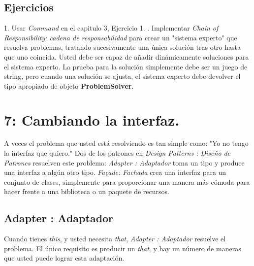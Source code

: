 \documentclass{article}
\begin{document}
\subsection{Ejercicios}
1. Usar \textit{Command} en el capitulo 3, Ejercicio 1.     . Implementar \textit{Chain of Responsibility: cadena de responsabilidad} para crear un "sistema experto" que resuelva problemas, tratando sucesivamente una única solución tras otro hasta que uno coincida. Usted debe ser capaz de añadir dinámicamente soluciones para el sistema experto. La prueba para la solución simplemente debe ser un juego de string, pero cuando una solución se ajusta, el sistema experto debe devolver el tipo apropiado de objeto \textbf{ProblemSolver}.     \newline

\section{7: Cambiando la interfaz.}

A veces el problema que usted está resolviendo es tan simple como: "Yo no tengo la interfaz que quiero." Dos de los patrones en \textit{Design Patterns : Diseño de Patrones} resuelven este problema: \textit{Adapter : Adaptador} toma un tipo y produce una interfaz a algún otro tipo.  \textit{Façade: Fachada} crea una interfaz para un conjunto de clases, simplemente para proporcionar una manera más cómoda para hacer frente a una biblioteca o un paquete de recursos.

\subsection{Adapter : Adaptador}

Cuando tienes \textit{this}, y usted necesita \textit{that}, \textit{Adapter : Adaptador} resuelve el problema. El único requisito es producir un \textit{that},  y hay un número de maneras que usted puede lograr esta adaptación.
\end{document}
